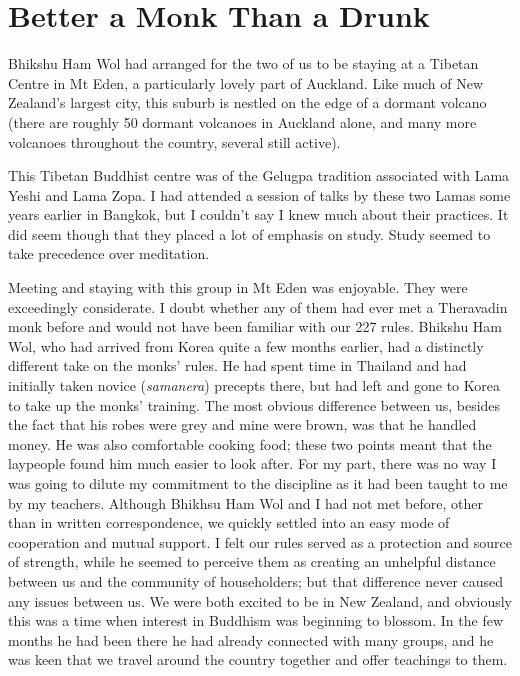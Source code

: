 \chapter{Better a Monk Than a Drunk}

Bhikshu Ham Wol had arranged for the two of us to be staying at a
Tibetan Centre in Mt Eden, a particularly lovely part of Auckland. Like
much of New Zealand's largest city, this suburb is nestled on the edge
of a dormant volcano (there are roughly 50 dormant volcanoes\cite{volcanic}
in Auckland alone, and many more volcanoes
throughout the country, several still active).

This Tibetan Buddhist centre was of the Gelugpa tradition associated
with Lama Yeshi and Lama Zopa. I had attended a session of talks by
these two Lamas some years earlier in Bangkok, but I couldn't say I knew
much about their practices. It did seem though that they placed a lot of
emphasis on study. Study seemed to take precedence over meditation.

Meeting and staying with this group in Mt Eden was enjoyable. They were
exceedingly considerate. I doubt whether any of them had ever met a
Theravadin monk before and would not have been familiar with our 227
rules. Bhikshu Ham Wol, who had arrived from Korea quite a few months
earlier, had a distinctly different take on the monks' rules. He had
spent time in Thailand and had initially taken novice (\emph{samanera})
precepts there, but had left and gone to Korea to take up the monks'
training. The most obvious difference between us, besides the fact that
his robes were grey and mine were brown, was that he handled money. He
was also comfortable cooking food; these two points meant that the
laypeople found him much easier to look after. For my part, there was no
way I was going to dilute my commitment to the discipline as it had been
taught to me by my teachers. Although Bhikhsu Ham Wol and I had not met
before, other than in written correspondence, we quickly settled into an
easy mode of cooperation and mutual support. I felt our rules served as
a protection and source of strength, while he seemed to perceive them as
creating an unhelpful distance between us and the community of
householders; but that difference never caused any issues between us. We
were both excited to be in New Zealand, and obviously this was a time
when interest in Buddhism was beginning to blossom. In the few months he
had been there he had already connected with many groups, and he was
keen that we travel around the country together and offer teachings to
them.

